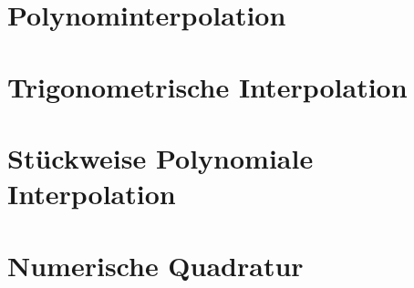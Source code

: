 \documentclass{article}
\begin{document}
\section{Polynominterpolation}






\newsection
\section{Trigonometrische Interpolation}











\newsection
\section{Stückweise Polynomiale Interpolation}





\newsection
\section{Numerische Quadratur}










\end{document}
